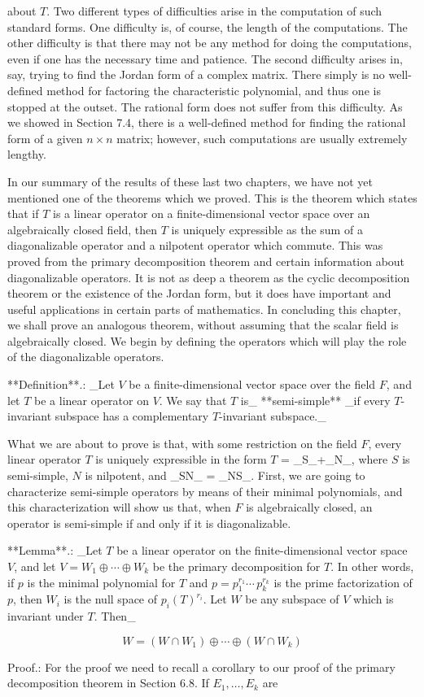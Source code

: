 about \(T\). Two different types of difficulties arise in the computation of such standard forms. One difficulty is, of course, the length of the computations. The other difficulty is that there may not be any method for doing the computations, even if one has the necessary time and patience. The second difficulty arises in, say, trying to find the Jordan form of a complex matrix. There simply is no well-defined method for factoring the characteristic polynomial, and thus one is stopped at the outset. The rational form does not suffer from this difficulty. As we showed in Section 7.4, there is a well-defined method for finding the rational form of a given \(n\times n\) matrix; however, such computations are usually extremely lengthy.

In our summary of the results of these last two chapters, we have not yet mentioned one of the theorems which we proved. This is the theorem which states that if \(T\) is a linear operator on a finite-dimensional vector space over an algebraically closed field, then \(T\) is uniquely expressible as the sum of a diagonalizable operator and a nilpotent operator which commute. This was proved from the primary decomposition theorem and certain information about diagonalizable operators. It is not as deep a theorem as the cyclic decomposition theorem or the existence of the Jordan form, but it does have important and useful applications in certain parts of mathematics. In concluding this chapter, we shall prove an analogous theorem, without assuming that the scalar field is algebraically closed. We begin by defining the operators which will play the role of the diagonalizable operators.

**Definition**.: _Let \(V\) be a finite-dimensional vector space over the field \(F\), and let \(T\) be a linear operator on \(V\). We say that \(T\) is_ **semi-simple** _if every \(T\)-invariant subspace has a complementary \(T\)-invariant subspace._

What we are about to prove is that, with some restriction on the field \(F\), every linear operator \(T\) is uniquely expressible in the form \(T\) = _S_+_N_, where \(S\) is semi-simple, \(N\) is nilpotent, and _SN_ = _NS_. First, we are going to characterize semi-simple operators by means of their minimal polynomials, and this characterization will show us that, when \(F\) is algebraically closed, an operator is semi-simple if and only if it is diagonalizable.

**Lemma**.: _Let \(T\) be a linear operator on the finite-dimensional vector space \(V\), and let \(V=W_{1}\oplus\cdots\oplus W_{k}\) be the primary decomposition for \(T\). In other words, if \(p\) is the minimal polynomial for \(T\) and \(p=p_{1}^{r_{1}}\cdots\,p_{k}^{r_{k}}\) is the prime factorization of \(p\), then \(W_{i}\) is the null space of \(p_{i}(T)^{r_{i}}\). Let \(W\) be any subspace of \(V\) which is invariant under \(T\). Then_

\[W=(W\cap W_{1})\oplus\cdots\oplus(W\cap W_{k})\]

Proof.: For the proof we need to recall a corollary to our proof of the primary decomposition theorem in Section 6.8. If \(E_{1},\ldots,E_{k}\) are 